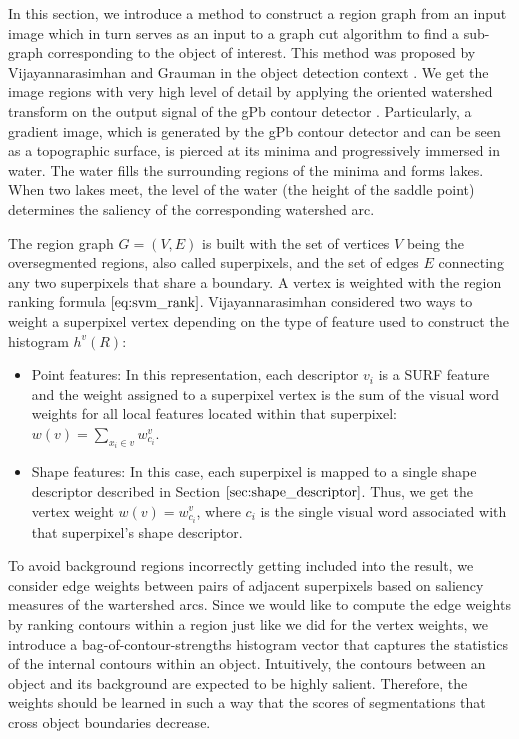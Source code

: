 \documentclass{SMBV12}
\begin{document}
In this section, we introduce a method to construct a region graph from an input image which in turn serves as an input to a graph cut algorithm to find a sub-graph corresponding to the object of interest. This method was proposed by Vijayannarasimhan and Grauman in the object detection context \cite{VijayGrauman2011}. We get the image regions with very high level of detail by applying the oriented watershed transform on the output signal of the gPb contour detector \cite{arbelaez2009contours}. Particularly, a gradient image, which is generated by the gPb contour detector and can be seen as a topographic surface, is pierced at its minima and progressively immersed in water. The water fills the surrounding regions of the minima and forms lakes. When two lakes meet, the level of the water (the height of the saddle point) determines the saliency of the corresponding watershed arc.

The region graph $G = (V, E)$ is built with the set of vertices $V$ being the oversegmented regions, also called superpixels, and the set of edges $E$ connecting any two superpixels that share a boundary. A vertex is weighted with the region ranking formula $\ref{eq:svm_rank}$. Vijayannarasimhan considered two ways to weight a superpixel vertex depending on the type of feature used to construct the histogram $h^v(R)$:

\begin{itemize}
\item Point features: In this representation, each descriptor $v_i$ is a SURF feature and the weight assigned to a superpixel vertex is the sum of the visual word weights for all local features located within that superpixel: $w(v) = \sum_{x_i \in v} w^v_{c_i}$.
\item Shape features: In this case, each superpixel is mapped to a single shape descriptor described in Section $\ref{sec:shape_descriptor}$. Thus, we get the vertex weight $w(v) = w^v_{c_i}$, where $c_i$ is the single visual word associated with that superpixel's shape descriptor.
\end{itemize}

To avoid background regions incorrectly getting included into the result, we consider edge weights between pairs of adjacent superpixels based on saliency measures of the wartershed arcs. Since we would like to compute the edge weights by ranking contours within a region just like we did for the vertex weights, we introduce a bag-of-contour-strengths histogram vector that captures the statistics of the internal contours within an object. Intuitively, the contours between an object and its background are expected to be highly salient. Therefore, the weights should be learned in such a way that the scores of segmentations that cross object boundaries decrease.
\end{document}
